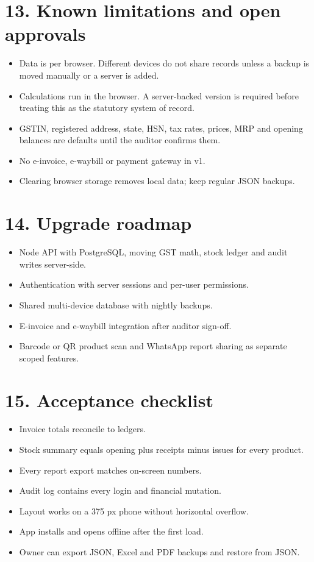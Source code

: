 \documentclass[11pt]{article}
\begin{document}
\section{13. Known limitations and open approvals}
\begin{itemize}[leftmargin=*,itemsep=2pt,topsep=2pt]
\item Data is per browser. Different devices do not share records unless a backup is moved manually or a server is added.
\item Calculations run in the browser. A server-backed version is required before treating this as the statutory system of record.
\item GSTIN, registered address, state, HSN, tax rates, prices, MRP and opening balances are defaults until the auditor confirms them.
\item No e-invoice, e-waybill or payment gateway in v1.
\item Clearing browser storage removes local data; keep regular JSON backups.
\end{itemize}
\clearpage
\section{14. Upgrade roadmap}
\begin{itemize}[leftmargin=*,itemsep=2pt,topsep=2pt]
\item Node API with PostgreSQL, moving GST math, stock ledger and audit writes server-side.
\item Authentication with server sessions and per-user permissions.
\item Shared multi-device database with nightly backups.
\item E-invoice and e-waybill integration after auditor sign-off.
\item Barcode or QR product scan and WhatsApp report sharing as separate scoped features.
\end{itemize}
\clearpage
\section{15. Acceptance checklist}
\begin{itemize}[leftmargin=*,itemsep=2pt,topsep=2pt]
\item Invoice totals reconcile to ledgers.
\item Stock summary equals opening plus receipts minus issues for every product.
\item Every report export matches on-screen numbers.
\item Audit log contains every login and financial mutation.
\item Layout works on a 375 px phone without horizontal overflow.
\item App installs and opens offline after the first load.
\item Owner can export JSON, Excel and PDF backups and restore from JSON.
\end{itemize}
\end{document}
